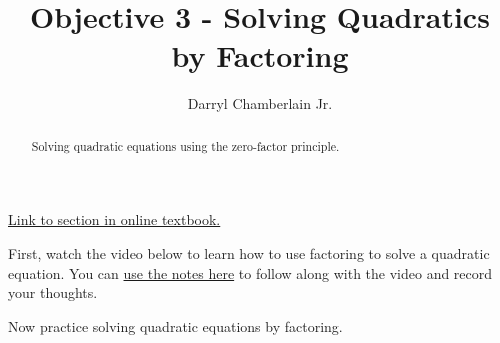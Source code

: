 \documentclass{ximera}
\author{Darryl Chamberlain Jr.}
\title{Objective 3 - Solving Quadratics by Factoring}
\begin{document}
\begin{abstract}
Solving quadratic equations using the zero-factor principle.
\end{abstract}
\maketitle

\href{https://cnx.org/contents/mwjClAV_@8.1:-Sm9he1Q@17/Quadratic-Functions}{Link to section in online textbook.}


First, watch the video below to learn how to use factoring to solve a quadratic equation. You can \href{http://people.clas.ufl.edu/dchamberlain31/files/M4-Objective-3-Solving-Quadratics-by-Factoring.pdf}{use the notes here} to follow along with the video and record your thoughts.


Now practice solving quadratic equations by factoring. 
\end{document}
